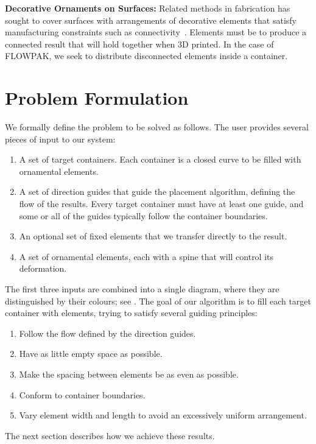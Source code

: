 \newtext
{
\textbf{Decorative Ornaments on Surfaces:} 
Related methods in fabrication has sought to cover surfaces with
arrangements of decorative elements that satisfy manufacturing
constraints such as connectivity~\cite{Chen2016, Zehnder2016, Bian2018, Martinez2019}.
Elements must be  to produce a connected result
that will hold together when 3D printed.
In the case of FLOWPAK, we seek to distribute disconnected elements inside a container.
}


\section{Problem Formulation}
\label{flowpak_problem_formulation}

We formally define the problem to be solved as follows.  The user provides several pieces of input
to our system:
\begin{enumerate}
      \item A set of target containers.
            Each container 
			is a closed curve to be filled with ornamental elements.
      \item A set of direction guides
      		that guide the placement algorithm, defining the flow of the results. 
      		Every target container must have at least one guide, and some or
      		all of the guides typically follow the container boundaries.
      \item An optional set of fixed elements that we transfer directly to the result.
      \item A set of ornamental elements, each with a spine that will control
            its deformation.
\end{enumerate}

The first three inputs are combined into a single diagram, where they are
distinguished by their colours; see
.
The goal of our algorithm is to fill each target container with elements,
trying to satisfy several guiding principles:

\begin{enumerate}
	\item Follow the flow defined by the direction guides.
	\item Have as little empty space as possible.
	\item Make the spacing between elements be as even as possible.
	\item Conform to container boundaries.
	\item Vary element width and length to avoid an excessively uniform arrangement.
\end{enumerate}
The next section describes how we achieve these results.

